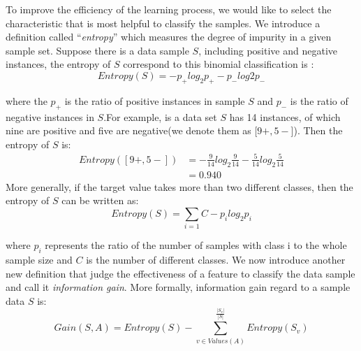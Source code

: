 To improve the efficiency of the learning process,  we would like to select the characteristic that is most helpful to classify the samples. We introduce a definition called ``\textit{entropy}'' which measures the degree of impurity in a given sample set. Suppose there is a data sample $S$,  including positive and negative instances,  the entropy of $S$ correspond to this binomial classification is : 
\begin{equation}
Entropy(S)=-p_+log_2 p_+-p_-log2p_-
\end{equation} 

where the $p_+$ is the ratio of positive instances in sample $S$ and $p_-$ is the ratio of negative instances in $S$.For example,  is a data set $S$ has 14 instances,  of which nine are positive and five are negative(we denote them as [$9+, 5-$]). Then the entropy of $S$ is: 
\begin{equation}\label{en: entropy}
\begin{aligned}
Entropy([9+, 5-])&=-\frac{9}{14}log_2 \frac{9}{14}-\frac{5}{14}log_2 \frac{5}{14}\\
&=0.940
\end{aligned}
\end{equation}
More generally,  if the target value takes more than two different classes, then the entropy of $S$ can be written as: 
\begin{equation}	
Entropy(S) = \sum_{i=1}{C}-p_ilog_2 p_i 	
\end{equation}

where $p_i$ represents the ratio of the number of samples with class i to the whole sample size and $C$ is the number of different classes. We now introduce another new definition that judge the effectiveness of a feature to classify the data sample and call it \textit{information gain}. More formally,  information gain regard to a sample data $S$ is: 
\begin{equation}
Gain(S, A)=Entropy (S) -\sum_{v\in Values(A)}^{\frac{|S_v|}{|S|}}Entropy(S_v)
\end{equation}

